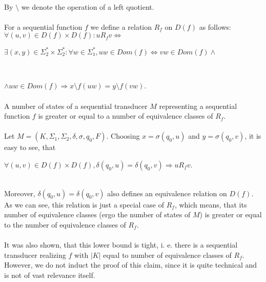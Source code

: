 \paragraph{}
\oznacenie By $\setminus $ we denote the operation of a left quotient.

\paragraph{}
 For a sequential function $f$  we define a relation $R_{f}$ on $D(f)$ as follows:\\
$\forall (u, v) \in D(f) \times D(f): u R_{f} v \iff$ \\
\centerline{$\exists (x, y) \in \Sigma_{2}^* \times \Sigma_{2}^*: \forall w \in \Sigma_{1}^{*}, uw \in Dom(f) \Leftrightarrow vw \in Dom(f) \wedge $}\\
\centerline{$\wedge uw \in Dom(f) \Rightarrow x\setminus f(uw) = y\setminus f(vw)$.}

\paragraph{}
\cveta A number of states of a sequential transducer $M$ representing a sequential function $f$ is greater or equal to a number of equivalence classes of $R_{f}$.

\paragraph{}
\dokaz Let $M=(K, \Sigma_{1}, \Sigma_{2}, \delta, \sigma, q_{0}, F)$. Choosing $x = \sigma (q_{0}, u)$ and $y = \sigma (q_{0}, v)$, it is easy to see, that\\
\centerline{$\forall (u,v) \in D(f) \times D(f), \delta (q_{0}, u) = \delta (q_{0}, v) \Rightarrow u R_{f} v$.}\\
Moreover, $\delta (q_{0}, u) = \delta (q_{0}, v)$ also defines an equivalence relation on $D(f)$. As we can see, this relation is just a special case of $R_{f}$, which means, that its number of equivalence classes (ergo the number of states of $M$) is greater or equal to the number of equivalence classes of $R_{f}$. \square

\paragraph{}
It was also shown, that this lower bound is tight, i. e. there is a sequential transducer realizing $f$ with $|K|$ equal to number of equivalence classes of $R_{f}$. However, we do not induct the proof of this claim, since it is quite technical and is not of vast relevance itself.

